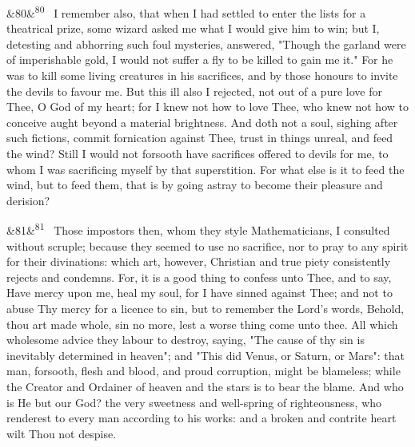 \documentclass[12pt]{article}
\newcommand{\para}[1][]{\par\noindent\ifx&#1&\else\textsuperscript{\footnotesize #1}~\fi}
\begin{document}
\para[80] I remember also, that when I had settled to enter the lists for a theatrical prize, some wizard asked me what I would give him to win; but I, detesting and abhorring such foul mysteries, answered, "Though the garland were of imperishable gold, I would not suffer a fly to be killed to gain me it." For he was to kill some living creatures in his sacrifices, and by those honours to invite the devils to favour me. But this ill also I rejected, not out of a pure love for Thee, O God of my heart; for I knew not how to love Thee, who knew not how to conceive aught beyond a material brightness. And doth not a soul, sighing after such fictions, commit fornication against Thee, trust in things unreal, and feed the wind? Still I would not forsooth have sacrifices offered to devils for me, to whom I was sacrificing myself by that superstition. For what else is it to feed the wind, but to feed them, that is by going astray to become their pleasure and derision?

\para[81] Those impostors then, whom they style Mathematicians, I consulted without scruple; because they seemed to use no sacrifice, nor to pray to any spirit for their divinations: which art, however, Christian and true piety consistently rejects and condemns. For, it is a good thing to confess unto Thee, and to say, Have mercy upon me, heal my soul, for I have sinned against Thee; and not to abuse Thy mercy for a licence to sin, but to remember the Lord's words, Behold, thou art made whole, sin no more, lest a worse thing come unto thee. All which wholesome advice they labour to destroy, saying, "The cause of thy sin is inevitably determined in heaven"; and "This did Venus, or Saturn, or Mars": that man, forsooth, flesh and blood, and proud corruption, might be blameless; while the Creator and Ordainer of heaven and the stars is to bear the blame. And who is He but our God? the very sweetness and well-spring of righteousness, who renderest to every man according to his works: and a broken and contrite heart wilt Thou not despise.
\end{document}
